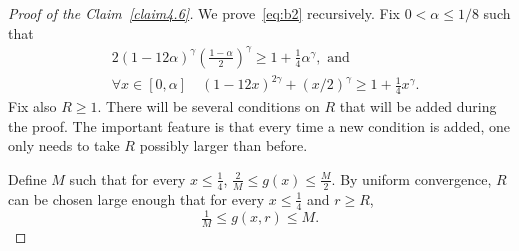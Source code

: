 \documentclass[10pt]{amsart}
\theoremstyle{definition}\newtheorem{defi}[theo]{Definition}\newtheorem{rema}[theo]{Remark}\newtheorem{exam}[theo]{Example}\newtheorem{exem}[theo]{Example}\newtheorem{nota}[theo]{Notation}
\let\oldforall\forall
\renewcommand*{\forall}{\mathrel{\oldforall}}
\begin{document}
\begin{proof}[{Proof of the Claim~\ref{claim4.6}}]
We prove~\eqref{eq:b2} recursively. Fix $0< \alpha\le 1/8$ such that
\begin{align}
&2 (1-12\alpha)^\gamma \left(\tfrac{1-\alpha}2\right)^\gamma\ge 1+\tfrac14 \alpha^\gamma,\text{ and} \label{eq:9}
\\\label{eq:10}
&\forall x\in[0,\alpha] \quad (1 - 12x)^{2\gamma}+(x/2)^\gamma
\ge 1+\tfrac14 x^\gamma.
\end{align}
Fix also $R\ge1$. There will be several conditions on $R$ that will be added during the proof. The important feature is that every time a new condition is added, one only needs to take $R$ possibly larger than before.

Define $M$ such that for every $x\le \tfrac14$, $\tfrac2M\le g(x)\le\tfrac M2$. By uniform convergence, $R$ can be chosen large enough that for every $x\le \tfrac14$ and $r\ge R$,
\begin{equation}
\tfrac1M\le g(x,r)\le M.\label{eq:b1}
\end{equation}


\end{proof}
\end{document}
